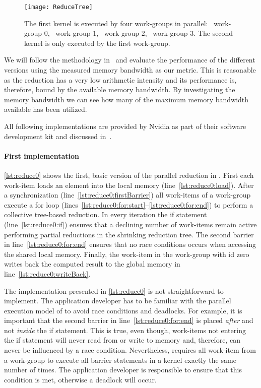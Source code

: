 \begin{figure}[t]
  \centering
  \texttt{[image: ReduceTree]}
  \caption{The first \OpenCL kernel is executed by four work-groups in parallel:
    \protect\firstBox{}~work-group $0$, \protect\secondBox{}~work-group $1$, \protect\thirdBox{}~work-group $2$, \protect\fourthBox{}~work-group $3$.
           The second \OpenCL kernel is only executed by the first work-group.}
  \label{fig:reduce:tree}
\end{figure}

We will follow the methodology in~\cite{Harris2007} and evaluate the performance of the different versions using the measured memory bandwidth as our metric.
This is reasonable as the reduction has a very low arithmetic intensity and its performance is, therefore, bound by the available memory bandwidth.
By investigating the memory bandwidth we can see how many of the maximum memory bandwidth available has been utilized.

All following implementations are provided by Nvidia as part of their software development kit and discussed in~\cite{Harris2007}.

\paragraph{First \OpenCL implementation}
\autoref{lst:reduce0} shows the first, basic version of the parallel reduction in \OpenCL.
First each work-item loads an element into the local memory (line~\ref{lst:reduce0:load}).
After a synchronization (line~\ref{lst:reduce0:firstBarrier}) all work-items of a work-group execute a for loop (lines~\ref{lst:reduce0:for:start}--\ref{lst:reduce0:for:end}) to perform a collective tree-based reduction.
In every iteration the if statement (line~\ref{lst:reduce0:if}) ensures that a declining number of work-items remain active performing partial reductions in the shrinking reduction tree.
The second barrier in line~\ref{lst:reduce0:for:end} ensures that no race conditions occurs when accessing the shared local memory.
Finally, the work-item in the work-group with id zero writes back the computed result to the global memory in line~\ref{lst:reduce0:writeBack}.

The implementation presented in \autoref{lst:reduce0} is not straightforward to implement.
The application developer has to be familiar with the parallel execution model of \OpenCL to avoid race conditions and deadlocks.
For example, it is important that the second barrier in line~\ref{lst:reduce0:for:end} is placed \emph{after} and not \emph{inside} the if statement.
This is true, even though, work-items not entering the if statement will never read from or write to memory and, therefore, can never be influenced by a race condition.
Nevertheless, \OpenCL requires all work-item from a work-group to execute all barrier statements in a kernel exactly the same number of times.
The application developer is responsible to ensure that this condition is met, otherwise a deadlock will occur.


